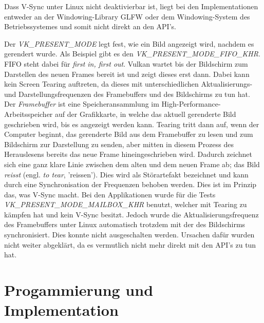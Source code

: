 \documentclass[titlepage, 11pt, a4paper, ngerman]{article}
\begin{document}
Dass V-Sync unter Linux nicht deaktivierbar ist, liegt bei den Implementationen entweder an der Windowing-Library \acrshort{GLFW} oder dem Windowing-System des Betriebssystemes und somit nicht direkt an den \acrshort{API}'s.\par
Der \textit{VK\_PRESENT\_MODE} legt fest, wie ein Bild angezeigt wird, nachdem es gerendert wurde. Als Beispiel gibt es den \textit{VK\_PRESENT\_MODE\_FIFO\_KHR}. FIFO steht dabei für \textit{first in, first out}. Vulkan wartet bis der Bildschirm zum Darstellen des neuen \glspl{Frame} bereit ist und zeigt dieses erst dann. Dabei kann kein Screen Tearing auftreten, da dieses mit unterschiedlichen Aktualisierungs- und Darstellungsfrequenzen des Framebuffers und des Bildschirms zu tun hat. Der \textit{Framebuffer} ist eine Speicheransammlung im High-Performance-Arbeitsspeicher auf der Grafikkarte, in welche das aktuell gerenderte Bild geschrieben wird, bis es angezeigt werden kann. Tearing tritt dann auf, wenn der Computer beginnt, das gerenderte Bild aus dem Framebuffer zu lesen und zum Bildschirm zur Darstellung zu senden, aber mitten in diesem Prozess des Herauslesens bereits das neue \gls{Frame} hineingeschrieben wird. Dadurch zeichnet sich eine ganz klare Linie zwischen dem alten und dem neuen \gls{Frame} ab; das Bild \textit{reisst} (engl. \textit{to tear}, 'reissen'). Dies wird als Störartefakt bezeichnet und kann durch eine Synchronisation der Frequenzen behoben werden. Dies ist im Prinzip das, was V-Sync macht. Bei den Applikationen wurde für die Tests \textit{VK\_PRESENT\_MODE\_MAILBOX\_KHR} benutzt, welcher mit Tearing zu kämpfen hat und kein V-Sync besitzt. Jedoch wurde die Aktualisierungsfrequenz des Framebuffers unter Linux automatisch trotzdem mit der des Bildschirms synchronisiert. Dies konnte nicht ausgeschalten werden. Ursachen dafür wurden nicht weiter abgeklärt, da es vermutlich nicht mehr direkt mit den \acrshort{API}'s zu tun hat.

\newpage
\section{Progammierung und Implementation}
\end{document}
